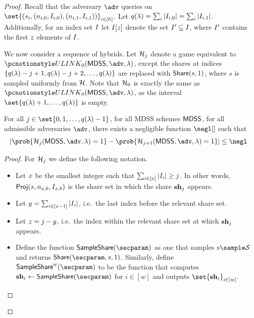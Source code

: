\begin{proof}

	Recall that the adversary $\adv$ queries on $\set{(\mdssSecret_i, (\mdssNumShares_{i, 0},\indexSet_{i, 0}), (\mdssNumShares_{i, 1}, \indexSet_{i, 1}))}_{i \in [\mdssNumShareSets]}$.
	Let $q(\lambda) = \sum_i |I_{i, 0}| = \sum_i |I_{i, 1}|$.
	Additionally, for an index set $I$ let $I[z]$ denote the set $I' \subseteq I$, where $I'$ contains the first $z$ elements of $I$.


	We now consider a sequence of hybrids.
	Let $\mathcal{H}_j$ denote a game equivalent to \\ $\ulink_0(\mdss, \adv, \secpar)$, except the shares at indices $\{q(\lambda) - j + 1, q(\lambda) - j + 2, \dots, \allowbreak q(\lambda)\}$ are replaced with $\mathsf{Share}(s, 1)$, where $s$ is sampled uniformly from $\mathcal{H}$.
	Note that $\mathcal{H}_0$ is exactly the same as $\ulink_0(\mdss, \adv, \secpar)$, as the interval $\set{q(\secpar) + 1, \dots, q(\secpar)}$ is empty.

	\begin{claim}
		For all $j \in \set{0, 1, \dots, q(\secpar) - 1}$, for all MDSS schemes $\mathsf{MDSS}$, for all admissible adversaries $\adv$, there exists a negligible function $\negl[]$ such that
		$$
			\left| \prob{\hyb_j(\mdss, \adv, \secpar) = 1} - \prob{\hyb_{j + 1}(\mdss, {\adv}, \secpar) = 1} \right| \leq \negl
		$$
	\end{claim}

	\begin{proof}
		For $\mathcal{H}_j$ we define the following notation.
		\begin{itemize}
			\item Let $x$ be the smallest integer such that $\sum_{i \in [x]} |I_i| \geq j$. In other words, $\mathsf{Proj}(\allowbreak s,\allowbreak n_{x, b},\allowbreak I_{x, b})$ is the share set in which the share $\mathbf{sh}_j$ appears.
			\item Let $y = \sum_{i \in [x - 1]} |I_i|$, i.e.\ the last index before the relevant share set.
			\item Let $z = j - y$, i.e.\ the index within the relevant share set at which $\mathbf{sh}_j$ appears.
			\item Define the function $\mdssSampleShare(\secparam)$ as one that samples $\mdssSecret \sample \mdssSecretSpace$ and returns $\mdssShareAlg(\secparam, \mdssSecret, 1)$.
			      Similarly, define $\mdssSampleShare^w(\secparam)$ to be the function that computes $\mdssBlindShare_i \gets \mdssSampleShare(\secparam)$ for $i \in [w]$ and outputs $\set{\mdssBlindShare_i}_{i \in [w]}$.
		\end{itemize}


\end{proof}
\end{proof}
